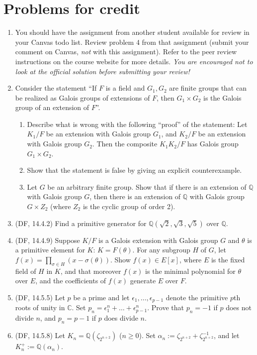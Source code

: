 \documentclass{amsart}
\theoremstyle{definition}
\newcommand{\Qq}{\mathbb{Q}}
\newcommand{\Cc}{\mathbb{C}}
\begin{document}
\section*{Problems for credit}
\begin{enumerate}
\item You should have the assignment from another student available for review in your Canvas todo list. Review problem 4 from that assignment (submit your comment on Canvas, \emph{not} with this assignment). Refer to the peer review instructions on the course website for more details. \emph{You are encouraged not to look at the official solution before submitting your review!}

\item Consider the statement ``If $F$ is a field and $G_1, G_2$ are finite groups that can be realized as Galois groups of extensions of $F$, then $G_1 \times G_2$ is the Galois group of an extension of $F$''.
  \begin{enumerate}
  \item  Describe what is wrong with the following ``proof'' of the statement: Let $K_1 / F$ be an extension with Galois group $G_1$, and $K_2 / F$ be an extension with Galois group $G_2$. Then the composite $K_1 K_2 / F$ has Galois group $G_1 \times G_2$.
  \item Show that the statement is false by giving an explicit counterexample.
  \item Let $G$ be an arbitrary finite group. Show that if there is an extension of $\Qq$ with Galois group $G$, then there is an extension of $\Qq$ with Galois group $G \times Z_2$ (where $Z_2$ is the cyclic group of order 2).
  \end{enumerate}

\item (DF, 14.4.2) Find a primitive generator for $\Qq (\sqrt{2}, \sqrt{3}, \sqrt{5})$ over $\Qq$.
\item (DF, 14.4.9) Suppose $K / F$ is a Galois extension with Galois group $G$ and $\theta$ is a primitive element for $K$: $K = F (\theta)$. For any subgroup $H$ of $G$, let $f (x) = \prod_{\sigma \in H} (x - \sigma (\theta))$. Show $f (x) \in E[x]$, where $E$ is the fixed field of $H$ in $K$, and that moreover $f (x)$ is the minimal polynomial for $\theta$ over $E$, and the coefficients of $f (x)$ generate $E$ over $F$.

  
\item (DF, 14.5.5) Let $p$ be a prime and let $\epsilon_1, \ldots, \epsilon_{p - 1}$ denote the primitive $p$th roots of unity in $\Cc$. Set $p_n = \epsilon_1^n + \ldots + \epsilon_{p - 1}^n$. Prove that $p_n = -1$ if $p$ does not divide $n$, and $p_n = p - 1$ if $p$ does divide $n$.
\item (DF, 14.5.8) Let $K_n = \Qq (\zeta_{2^{n + 2}})$ ($n \ge 0$). Set $\alpha_n := \zeta_{2^{n + 2}} + \zeta_{2^{n + 2}}^{-1}$, and let $K_n^+ := \Qq (\alpha_n)$.


\end{enumerate}
\end{document}
